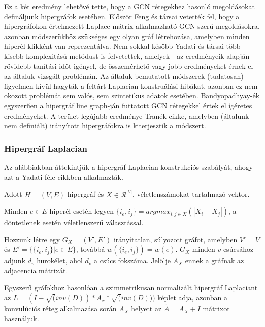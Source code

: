 Ez a két eredmény lehetővé tette, hogy a GCN rétegekhez hasonló megoldásokat defináljunk hipergráfok esetében. Először Feng és társai vetették fel, hogy a hipergráfokon értelmezett Laplace-mátrix alkalmazható GCN-szerű megoldásokra\cite{hgnn}, azonban módszerükhöz szükséges egy olyan gráf létrehozása, amelyben minden hiperél klikként van reprezentálva. Nem sokkal később Yadati és társai több kisebb komplexitású metódust is felvetettek\cite{hgcn}, amelyek - az eredményeik alapján - rövidebb tanítási időt igényel, de összemérhető vagy jobb eredményeket érnek el az általuk vizsgált problémán. Az általuk bemutatott módszerek (tudatosan) figyelmen kívül hagyták a feltárt Laplacian-konstruálási hibákat, azonban ez nem okozott problémát sem valós, sem szintetikus adatok esetében. Bandyopadhyay-ék egyszerűen a hipergráf line graph-ján futtatott GCN rétegekkel értek el ígéretes eredményeket\cite{line_hgnn}. A terület legújabb eredménye Tranék cikke\cite{directed_hgnn}, amelyben (általunk nem definiált) irányított hipergráfokra is kiterjesztik a módszert.

\subsubsection{Hipergráf Laplacian}

Az alábbiakban áttekintjük a hipergráf Laplacian konstrukciós szabályát, ahogy azt a Yadati-féle cikkben alkalmazták\cite{hgcn}.


Adott $H=(V,E)$ hipergráf és $X \in \mathcal{R}^{|V|}$, véletlenszámokat tartalmazó vektor.

\begin{compactenum}
	\item Minden $e \in E$ hiperél esetén legyen $\{i_e, i_j\} = argmax_{i,j \in X}(|X_i - X_j|)$, a döntetlenek esetén véletlenszerű választással.
	\item Hozzunk létre egy $G_X=(V',E')$ irányítatlan, súlyozott gráfot, amelyben $V'=V$ és $E'=\{\{i_e, i_j\} | e \in E\}$, továbbá $w(\{i_e, i_j\})=w(e)$. $G_X$ minden $v$ csúcsához adjunk $d_v$ hurokélet, ahol $d_v$ a csúcs fokszáma. Jelölje $A_X$ ennek a gráfnak az adjacencia mátrixát.
	\item Egyszerű gráfokhoz hasonlóan a szimmetrikusan normalizált hipergráf Laplaciant az $L = (I-\sqrt(inv(D))*A_x*\sqrt(inv(D)))$ képlet adja, azonban a konvulúciós réteg alkalmazása során $A_X$ helyett az $\tilde A = A_X + I$ mátrixot használjuk.
\end{compactenum}

